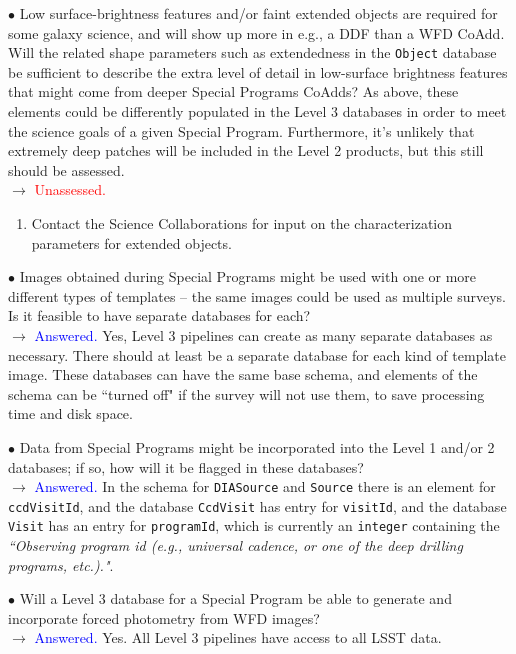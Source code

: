 \documentclass[DM,lsstdraft,toc]{lsstdoc}
\begin{document}
$\bullet$ Low surface-brightness features and/or faint extended objects are required for some galaxy science, and will show up more in e.g., a DDF than a WFD CoAdd. Will the related shape parameters such as extendedness in the {\tt Object} database be sufficient to describe the extra level of detail in low-surface brightness features that might come from deeper Special Programs CoAdds? As above, these elements could be differently populated in the Level 3 databases in order to meet the science goals of a given Special Program. Furthermore, it's unlikely that extremely deep patches will be included in the Level 2 products, but this still should be assessed.\\
$\rightarrow$ \textcolor{red}{Unassessed.}
\begin{enumerate}[resume,topsep=-10pt,label= \textbf{Concern \Roman*.}] \item \label{C11} Contact the Science Collaborations for input on the characterization parameters for extended objects. \end{enumerate}

$\bullet$ Images obtained during Special Programs might be used with one or more different types of templates -- the same images could be used as multiple surveys. Is it feasible to have separate databases for each? \\ 
$\rightarrow$ \textcolor{blue}{Answered.} Yes, Level 3 pipelines can create as many separate databases as necessary. There should at least be a separate database for each kind of template image. These databases can have the same base schema, and elements of the schema can be ``turned off" if the survey will not use them, to save processing time and disk space. 

$\bullet$ Data from Special Programs might be incorporated into the Level 1 and/or 2 databases; if so, how will it be flagged in these databases? \\
$\rightarrow$  \textcolor{blue}{Answered.} In the schema for {\tt DIASource} and {\tt Source} there is an element for {\tt ccdVisitId}, and the database {\tt CcdVisit} has entry for {\tt visitId}, and the database {\tt Visit} has an entry for {\tt programId}, which is currently an {\tt integer} containing the {\it ``Observing program id (e.g., universal cadence, or one of the deep drilling programs, etc.)."}. 

$\bullet$ Will a Level 3 database for a Special Program be able to generate and incorporate forced photometry from WFD images? \\
$\rightarrow$ \textcolor{blue}{Answered.} Yes. All Level 3 pipelines have access to all LSST data.
\end{document}
